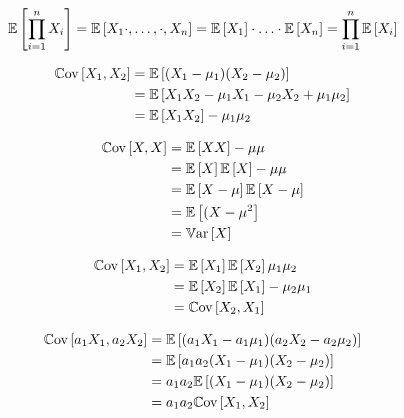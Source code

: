 \documentclass[12pt]{article}
\begin{document}

\begin{enumerate}


\begin{align*}
    \expe{\prod_{i=1}^{n} X_i} = \expe{X_1 \cdot, \ldots, \cdot, X_n} = \expe{X_1} \cdot \ldots \cdot \expe{X_n} = \prod_{i=1}^n \expe{X_i}
\end{align*}


\begin{align*}
    \cov{X_1}{X_2} &= \expe{(X_1 - \mu_1)(X_2 - \mu_2)}  \\
    &= \expe{X_1X_2-\mu_1X_1-\mu_2X_2 + \mu_1\mu_2} \\ 
    &= \expe{X_1X_2} - \mu_1\mu_2
\end{align*}


\begin{align*}
    \cov{X}{X} &= \expe{XX} - \mu\mu \\  
    &= \expe{X}\expe{X}-\mu\mu \\
    &= \expe{X-\mu}\expe{X-\mu} \\
    &= \expe{(X-\mu^2} \\
    &= \var{X}
\end{align*}


\begin{align*}
    \cov{X_1}{X_2} &= \expe{X_1}\expe{X_2} \mu_1\mu_2 \\
    &= \expe{X_2}\expe{X_1} - \mu_2\mu_1 \\ 
    &= \cov{X_2}{X_1}
\end{align*}


\begin{align*}
    \cov{a_1 X_1}{a_2 X_2} &= \expe{(a_1X_1-a_1\mu_1)(a_2X_2-a_2\mu_2)} \\
    &= \expe{a_1a_2(X_1-\mu_1)(X_2-\mu_2)} \\ 
    &= a_1a_2\expe{(X_1-\mu_1)(X_2-\mu_2)} \\
    &= a_1a_2\cov{X_1}{X_2}
\end{align*}


\end{enumerate}
\end{document}
